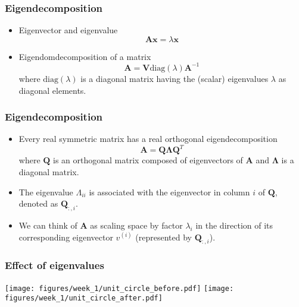 \documentclass[notes]{beamer}          %
\newcommand{\vect}[1]{\bm{#1}}
\begin{document}
\begin{frame}
\frametitle{Eigendecomposition}
    \begin{itemize}
        \item Eigenvector and eigenvalue
        $$ \vect{A}\vect{x} = \lambda \vect{x}$$
        \item Eigendomdecomposition of a matrix
        $$ \vect{A} = \vect{V} \mbox{diag}(\lambda) \vect{A}^{-1}$$
        where $\mbox{diag}(\lambda)$ is a diagonal matrix having the (scalar) eigenvalues $\lambda$ as diagonal elements.
    \end{itemize}

\end{frame}

\begin{frame}
\frametitle{Eigendecomposition}
    \begin{itemize}
        \item Every real symmetric matrix has a real orthogonal eigendecomposition
        $$ \vect{A} = \vect{Q} \vect{\Lambda} \vect{Q}^T $$
        where $\vect{Q}$ is an orthogonal matrix composed of eigenvectors of $\vect{A}$ and $\vect{\Lambda}$ is a diagonal matrix.
        \item The eigenvalue $\Lambda_{ii}$ is associated with the eigenvector in column $i$ of $\vect{Q}$, denoted as $\vect{Q}_{:,i}$.
        \item We can think of $\vect{A}$ as scaling space by factor $\lambda_i$ in the direction of its corresponding eigenvector $v^{(i)}$ (represented by $\vect{Q}_{:,i}$).
    \end{itemize}

\end{frame}

\begin{frame}
\frametitle{Effect of eigenvalues}

\begin{center}
\texttt{[image: figures/week\_1/unit\_circle\_before.pdf]}
\hfill
\texttt{[image: figures/week\_1/unit\_circle\_after.pdf]}
\end{center}

\end{frame}
\end{document}
